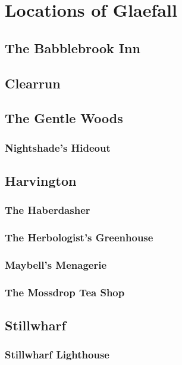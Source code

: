 \chapter{Locations of Glaefall}

\section{The Babblebrook Inn}

\section{Clearrun}

\section{The Gentle Woods}

\subsection{Nightshade's Hideout}

\section{Harvington}

\subsection{The Haberdasher}

\subsection{The Herbologist's Greenhouse}

\subsection{Maybell's Menagerie}

\subsection{The Mossdrop Tea Shop}

\section{Stillwharf}

\subsection{Stillwharf Lighthouse}

